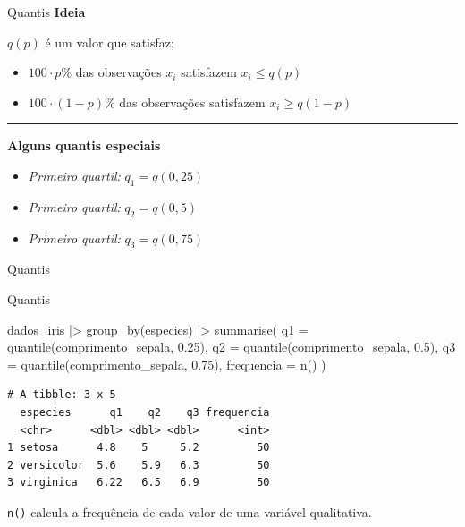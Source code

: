 \documentclass[
  10pt,
  ignorenonframetext,
]{beamer}
\newenvironment{Shaded}{\begin{snugshade}}{\end{snugshade}}
\newcommand{\AttributeTok}[1]{\textcolor[rgb]{0.40,0.45,0.13}{#1}}
\newcommand{\FloatTok}[1]{\textcolor[rgb]{0.68,0.00,0.00}{#1}}
\newcommand{\FunctionTok}[1]{\textcolor[rgb]{0.28,0.35,0.67}{#1}}
\newcommand{\NormalTok}[1]{\textcolor[rgb]{0.00,0.23,0.31}{#1}}
\newcommand{\SpecialCharTok}[1]{\textcolor[rgb]{0.37,0.37,0.37}{#1}}
\providecommand{\tightlist}{%
  \setlength{\itemsep}{0pt}\setlength{\parskip}{0pt}}\usepackage{longtable,booktabs,array}
\newcommand*{\regrafina}{\rule{\textwidth}{0.5pt}}
\begin{document}
\begin{frame}{Quantis}
\protect\hypertarget{quantis}{}
\textbf{Ideia}

\(q(p)\) é um valor que satisfaz;

\begin{itemize}
\tightlist
\item
  \(100 \cdot p\%\) das observações \(x_i\) satisfazem \(x_i \leq q(p)\)
\item
  \(100 \cdot (1-p)\%\) das observações satisfazem \(x_i \geq q(1-p)\)
\end{itemize}

\regrafina

\textbf{Alguns quantis especiais}

\begin{itemize}
\tightlist
\item
  \emph{Primeiro quartil:} \(q_1 = q(0,25)\)
\item
  \emph{Primeiro quartil:} \(q_2 = q(0,5)\)
\item
  \emph{Primeiro quartil:} \(q_3 = q(0,75)\)
\end{itemize}
\end{frame}

\begin{frame}{Quantis}
\protect\hypertarget{quantis-1}{}
\end{frame}

\begin{frame}[fragile]{Quantis}
\protect\hypertarget{quantis-2}{}
\begin{Shaded}
\begin{Highlighting}[]
\NormalTok{dados\_iris }\SpecialCharTok{|\textgreater{}}
  \FunctionTok{group\_by}\NormalTok{(especies) }\SpecialCharTok{|\textgreater{}}
  \FunctionTok{summarise}\NormalTok{(}
    \AttributeTok{q1 =} \FunctionTok{quantile}\NormalTok{(comprimento\_sepala, }\FloatTok{0.25}\NormalTok{),}
    \AttributeTok{q2 =} \FunctionTok{quantile}\NormalTok{(comprimento\_sepala, }\FloatTok{0.5}\NormalTok{),}
    \AttributeTok{q3 =} \FunctionTok{quantile}\NormalTok{(comprimento\_sepala, }\FloatTok{0.75}\NormalTok{),}
    \AttributeTok{frequencia =} \FunctionTok{n}\NormalTok{()}
\NormalTok{  )}
\end{Highlighting}
\end{Shaded}

\begin{verbatim}
# A tibble: 3 x 5
  especies      q1    q2    q3 frequencia
  <chr>      <dbl> <dbl> <dbl>      <int>
1 setosa      4.8    5     5.2         50
2 versicolor  5.6    5.9   6.3         50
3 virginica   6.22   6.5   6.9         50
\end{verbatim}

\texttt{n()} calcula a frequência de cada valor de uma variável
qualitativa.
\end{frame}
\end{document}
